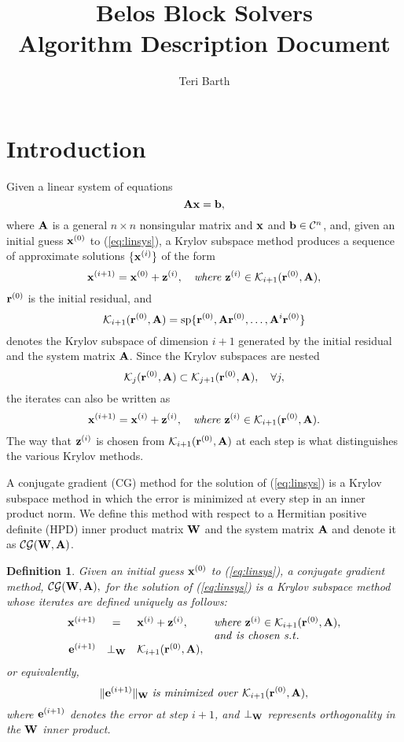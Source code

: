 \documentclass{article}
\newtheorem{defn}{Definition}[section]
\newcommand{\bA}{{\bf A}}
\newcommand{\bW}{{\bf W}}
\newcommand{\bx}{{\bf x}}
\newcommand{\bz}{{\bf z}}
\newcommand{\br}{{\bf r}}
\newcommand{\be}{{\bf e}}
\newcommand{\bb}{{\bf b}}
\newcommand{\dm}{\begin{displaymath}}
\newcommand{\edm}{\end{displaymath}}
\newcommand{\eq}{\begin{equation}}
\newcommand{\eeq}{\end{equation}}
\begin{document}

\title{Belos Block Solvers \\
       Algorithm Description Document}

\author{Teri Barth}

\maketitle


\section{Introduction}


Given a linear system of equations
  \eq \bA \bx = \bb,
  \label{eq:linsys}
  \eeq
where $\bA$ is a general $n \times n$ nonsingular matrix and $\bx$
and $\bb \in {\cal C}^n$, and, given an initial guess $\bx^{(0)}$
to (\ref{eq:linsys}), a Krylov subspace method produces a sequence
of approximate solutions $\{ \bx^{(i)} \}$ of the form
 \dm
 \bx^{(i+1)} = \bx^{(0)} + \bz^{(i)}, \quad  {\it where}~\bz^{(i)} \in {\cal
 K}_{i+1}(\br^{(0)},\bA),
 \edm
 $\br^{(0)}$ is the initial residual, and
  \dm
 {\cal K}_{i+1}(\br^{(0)},\bA) = {\rm sp}\{\br^{(0)},\bA \br^{(0)},\ldots,\bA^{i} \br^{(0)}\}
 \edm
denotes the Krylov subspace of dimension $i+1$ generated by the
initial residual and the system matrix $\bA$.  Since the Krylov
subspaces are nested
 \dm
 {\cal K}_j(\br^{(0)}, \bA) \subset {\cal K}_{j+1}(\br^{(0)}, \bA), \quad
 \forall j,
 \edm
the iterates can also be written as
 \dm
 \bx^{(i+1)} = \bx^{(i)} + \bz^{(i)}, \quad  {\it where}~\bz^{(i)} \in {\cal
 K}_{i+1}(\br^{(0)},\bA).
 \edm
The way that $\bz^{(i)}$ is chosen from ${\cal K}_{i+1}(\br^{(0)},
\bA)$ at each step is what distinguishes the various Krylov
methods.

A conjugate gradient (CG) method for the solution of
(\ref{eq:linsys}) is a Krylov subspace method in which the error
is minimized at every step in an inner product norm. We define
this method with respect to a Hermitian positive definite (HPD)
inner product matrix $\bW$ and the system matrix $\bA$ and denote
it as ${\cal CG}(\bW,\bA)$.

\begin{defn} \label{def:cg_method}
{Given an initial guess $\bx^{(0)}$ to (\ref{eq:linsys}), a
conjugate gradient method, ${\cal CG}(\bW,\bA),$ for the solution
of (\ref{eq:linsys}) is a Krylov subspace method whose iterates
are defined uniquely as follows:
 \eq
 \begin{array}{rcll}
 \bx^{(i+1)} &=& \bx^{(i)} + \bz^{(i)}, \quad & {\it where}~\bz^{(i)} \in {\cal
 K}_{i+1}(\br^{(0)},\bA), \\
 ~&~&~&{\it and~is~chosen~s.t.} \\
  \be^{(i+1)} & \perp_{\bW} & {\cal K}_{i+1} (\br^{(0)}, \bA), &~
 \end{array}
 \label{eq:cg_iterates}
  \eeq
or equivalently,
 \dm
 \| \be^{(i+1)} \|_{\bW} ~{\it is~minimized~over}~ {\cal K}_{i+1} (\br^{(0)},\bA),
 \edm
 where $\be^{(i+1)}$ denotes the error at step $i+1$, and $\perp_{\bW}$
 represents orthogonality in the $\bW$ inner product. }
\end{defn}
\end{document}
